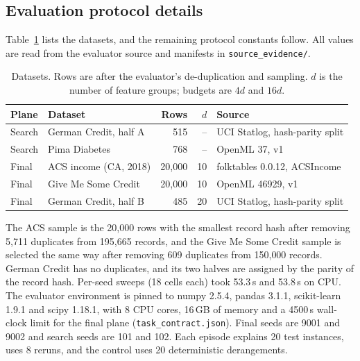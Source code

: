\documentclass{article}
\begin{document}
\subsection{Evaluation protocol details}
Table~\ref{tab:data} lists the datasets, and the remaining protocol constants follow. All values are read from the evaluator source and manifests in \texttt{source\_evidence/}.
\begin{table}[h]
\centering
\caption{Datasets. Rows are after the evaluator's de-duplication and sampling. $d$ is the number of feature groups; budgets are $4d$ and $16d$.}
\label{tab:data}
\small
\begin{tabular}{llrrl}
\toprule
Plane & Dataset & Rows & $d$ & Source \\
\midrule
Search & German Credit, half A & 515 & -- & UCI Statlog, hash-parity split \\
Search & Pima Diabetes & 768 & -- & OpenML 37, v1 \\
Final & ACS income (CA, 2018) & 20{,}000 & 10 & folktables 0.0.12, ACSIncome \\
Final & Give Me Some Credit & 20{,}000 & 10 & OpenML 46929, v1 \\
Final & German Credit, half B & 485 & 20 & UCI Statlog, hash-parity split \\
\bottomrule
\end{tabular}
\end{table}
The ACS sample is the 20{,}000 rows with the smallest record hash after removing 5{,}711 duplicates from 195{,}665 records, and the Give Me Some Credit sample is selected the same way after removing 609 duplicates from 150{,}000 records. German Credit has no duplicates, and its two halves are assigned by the parity of the record hash. Per-seed sweeps (18 cells each) took 53.3\,s and 53.8\,s on CPU. %
The evaluator environment is pinned to numpy 2.5.4, pandas 3.1.1, scikit-learn 1.9.1 and scipy 1.18.1, with 8 CPU cores, 16\,GB of memory and a 4500\,s wall-clock limit for the final plane (\texttt{task\_contract.json}). Final seeds are 9001 and 9002 and search seeds are 101 and 102. Each episode explains 20 test instances, uses 8 reruns, and the control uses 20 deterministic derangements.
\end{document}
